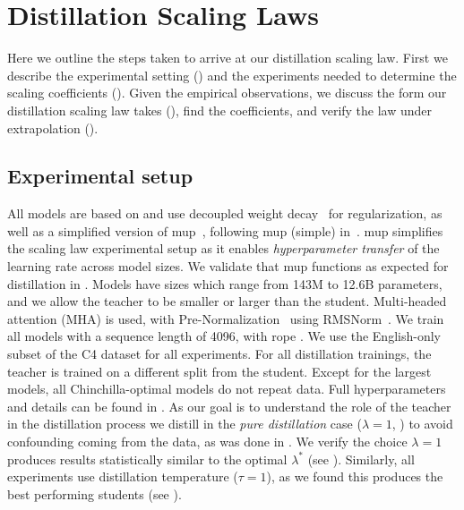 \section{Distillation Scaling Laws}
\label{sec:distillation-scaling-laws}

Here we outline the steps taken to arrive at our distillation scaling law.
First we describe the experimental setting ()
and the experiments
needed to determine the scaling coefficients
().
Given the empirical observations, we discuss the form our distillation scaling law takes
(),
find the coefficients, and verify the law under extrapolation
().

\subsection{Experimental setup}
\label{ssec:experimental-setup}

All models are based on
\citet{DBLP:journals/corr/abs-2407-21075} and use decoupled weight
decay~\citet{DBLP:conf/iclr/LoshchilovH19} for regularization, as well as a simplified version of
\gls{mup}~\citep{DBLP:conf/icml/YangH21,DBLP:journals/corr/abs-2308-01814,DBLP:journals/corr/abs-2203-03466,DBLP:journals/corr/abs-2309-14322,DBLP:journals/corr/abs-2310-17813},
following \gls{mup} (simple) in~\cite{DBLP:conf/iclr/WortsmanLXEAACG24}.
\gls{mup} simplifies the scaling law experimental setup as it enables \emph{hyperparameter transfer} of the learning rate across model sizes.
We validate that \gls{mup} functions as expected for distillation
in .
Models have sizes which range from 143M to 12.6B parameters, and we allow the teacher to be smaller or larger than the student.
Multi-headed attention (MHA) is used, with
Pre-Normalization~\cite{DBLP:conf/iwslt/NguyenS19} using RMSNorm~\cite{DBLP:conf/nips/ZhangS19a}.
We train all models with a sequence length of 4096, with \gls{rope} \citep{DBLP:journals/ijon/SuALPBL24}. 
We use the English-only subset of the C4 dataset \citep{DBLP:journals/jmlr/RaffelSRLNMZLL20} for all experiments.
For all distillation trainings, the teacher is trained on a different split from the student. Except for the largest models, all Chinchilla-optimal models do not repeat data. Full hyperparameters and details can be found in .
As our goal is to understand the role of the teacher in the distillation process
we distill in the \emph{pure distillation} case ($\lambda=1$, ) to avoid confounding coming from the data, as was done in \citet{DBLP:conf/nips/StantonIKAW21}.
We verify the choice $\lambda=1$ produces results statistically similar to the optimal $\lambda^*$ (see ).
Similarly, all experiments use distillation temperature ($\tau=1$),
as we found this produces the best performing students
(see ).

